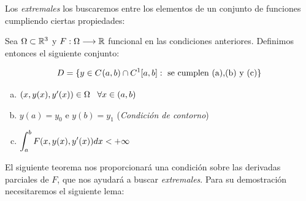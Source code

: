 Los \textit{extremales} los buscaremos entre los elementos de un conjunto de funciones cumpliendo ciertas propiedades:

\begin{definition}
\label{espaciofuncionesbuenas}

Sea $\Omega\subset\R^3$ y $F:\Omega\longrightarrow \R$ funcional en las condiciones anteriores. Definimos entonces el siguiente conjunto:

\begin{equation}\label{espaciofunciones}
D=\{y\in\continuasabierto\cap\continuas[1]: \text{ se cumplen (a),(b) y (c)}\}
\end{equation}

\begin{enumerate}[(a)]

\item $(x,y(x),y'(x))\in\Omega \espacio \forall x\in\xcero$
\item $y(a)=y_0$ e $y(b)=y_1$ (\textit{Condición de contorno})
\item $\displaystyle\int_{a}^b\fvariaciones dx<+\infty$ 
\end{enumerate}

\end{definition}

El siguiente teorema nos proporcionará una condición sobre las derivadas parciales de $F$, que nos ayudará a buscar \textit{extremales}. Para su demostración necesitaremos el siguiente lema:


